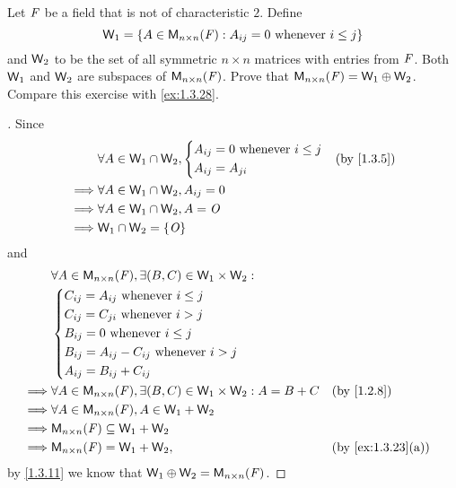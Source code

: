 \begin{ex}\label{ex:1.3.29}
  Let \(\mathit{F}\) be a field that is not of characteristic \(2\).
  Define
  \[
    \W_1 = \set{A \in \ms[n][n][\F] : A_{i j} = 0 \text{ whenever } i \leq j}
  \]
  and \(\mathsf{W}_2\) to be the set of all symmetric \(n \times n\) matrices with entries from \(\mathit{F}\).
  Both \(\mathsf{W}_1\) and \(\mathsf{W}_2\) are subspaces of \(\ms[n][n][\F]\).
  Prove that \(\ms[n][n][\F] = \W_1 \oplus \W_2\).
  Compare this exercise with \cref{ex:1.3.28}.
\end{ex}

\begin{proof}[]
  Since
  \begin{align*}
             & \forall A \in \W_1 \cap \W_2, \begin{dcases}
                                               A_{i j} = 0 \text{ whenever } i \leq j \\
                                               A_{i j} = A_{j i}
                                             \end{dcases} &  & \by{1.3.5} \\
    \implies & \forall A \in \W_1 \cap \W_2, A_{i j} = 0                            \\
    \implies & \forall A \in \W_1 \cap \W_2, A = \zm                                \\
    \implies & \W_1 \cap \W_2 = \set{\zm}
  \end{align*}
  and
  \begin{align*}
             & \forall A \in \ms[n][n][\F], \exists (B, C) \in \W_1 \times \W_2 :                                  \\
             & \begin{dcases}
                 C_{i j} = A_{i j} \text{ whenever } i \leq j        \\
                 C_{i j} = C_{j i} \text{ whenever } i > j           \\
                 B_{i j} = 0 \text{ whenever } i \leq j              \\
                 B_{i j} = A_{i j} - C_{i j} \text{ whenever } i > j \\
                 A_{i j} = B_{i j} + C_{i j}
               \end{dcases}                                                 \\
    \implies & \forall A \in \ms[n][n][\F], \exists (B, C) \in \W_1 \times \W_2 : A = B + C &  & \by{1.2.8}        \\
    \implies & \forall A \in \ms[n][n][\F], A \in \W_1 + \W_2                                                      \\
    \implies & \ms[n][n][\F] \subseteq \W_1 + \W_2                                                                 \\
    \implies & \ms[n][n][\F] = \W_1 + \W_2,                                                 &  & \by{ex:1.3.23}[a]
  \end{align*}
  by \cref{1.3.11} we know that \(\W_1 \oplus \W_2 = \ms[n][n][\F]\).
\end{proof}

